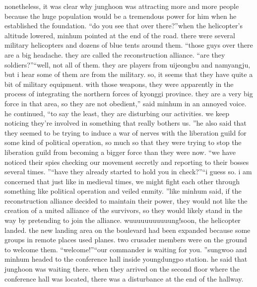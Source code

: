 nonetheless, it was clear why junghoon was attracting more and more people because the huge population would be a tremendous power for him when he established the foundation.
“do you see that over there?”when the helicopter’s altitude lowered, minhum pointed at the end of the road.
there were several military helicopters and dozens of blue tents around them.
“those guys over there are a big headache.
 they are called the reconstruction alliance.
“are they soldiers?”“well, not all of them.
 they are players from uijeongbu and namyangju, but i hear some of them are from the military.
 so, it seems that they have quite a bit of military equipment.
 with those weapons, they were apparently in the process of integrating the northern forces of kyonggi province.
 they are a very big force in that area, so they are not obedient,” said minhum in an annoyed voice.
he continued, “to say the least, they are disturbing our activities.
 we keep noticing they’re involved in something that really bothers us.
”he also said that they seemed to be trying to induce a war of nerves with the liberation guild for some kind of political operation, so much so that they were trying to stop the liberation guild from becoming a bigger force than they were now.
“we have noticed their spies checking our movement secretly and reporting to their bosses several times.
”“have they already started to hold you in check?”“i guess so.
 i am concerned that just like in medieval times, we might fight each other through something like political operation and veiled enmity.
”like minhum said, if the reconstruction alliance decided to maintain their power, they would not like the creation of a united alliance of the survivors, so they would likely stand in the way by pretending to join the alliance.
wuuuuuuuuuuung!soon, the helicopter landed.
 the new landing area on the boulevard had been expanded because some groups in remote places used planes.
two crusader members were on the ground to welcome them.
“welcome!”“our commander is waiting for you.
”sungwoo and minhum headed to the conference hall inside youngdungpo station.
 he said that junghoon was waiting there.
when they arrived on the second floor where the conference hall was located, there was a disturbance at the end of the hallway.


 